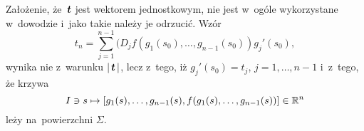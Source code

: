 \documentclass[a4paper,11pt]{article}
\begin{document}
















\start {} Założenie, że~$\boldsymbol{t}$ jest wektorem jednostkowym, nie jest w~ogóle wykorzystane w~dowodzie i~jako takie należy je odrzucić. Wzór
\begin{equation}
  \label{eq:Marcinkowska-01}
  t_{ n }
  = \sum_{ j = 1 }^{ n - 1 } ( D_{ j } f\left( g_{ 1 }( s_{ 0 } ), \ldots,
  g_{ n - 1 }( s_{ 0 } ) \right) g_{ j }'( s_{ 0 } ),
\end{equation}
wynika nie z~warunku $|\, {  \boldsymbol{t}  } \,|$, lecz z~tego, iż $g_{ j }'( s_{ 0 } ) = t_{ j }$, $j = 1, \ldots, n - 1$ i~z~tego, że krzywa
\begin{equation}
  \label{eq:Marcinkowska-02}
  I \ni s \mapsto [ g_{ 1 }( s ), \ldots, g_{ n - 1 }( s ),
  f( g_{ 1 }( s ), \ldots, g_{ n - 1 }( s ) ) ] \in \mathbb{ R }^{ n }
\end{equation}
leży na~powierzchni $\Sigma$.
\end{document}
